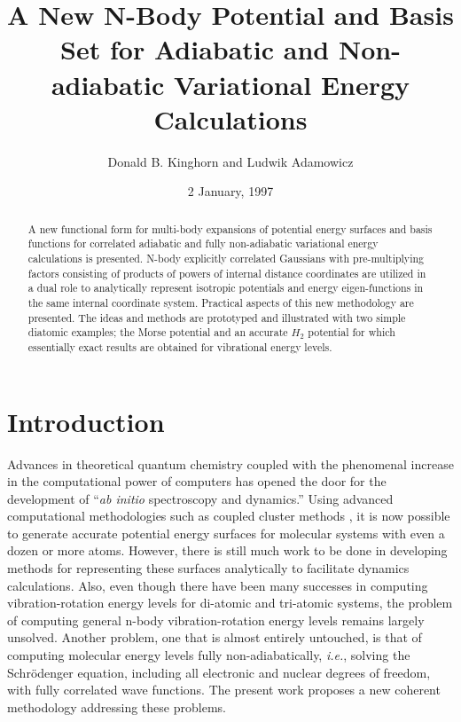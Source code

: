 






\author{Donald B. Kinghorn and Ludwik Adamowicz}
\address{Dept. of Chemistry, University of Arizona, Tucson, AZ 85721}
\title{A New N-Body Potential and Basis Set for Adiabatic and Non-adiabatic
Variational Energy Calculations }
\date{2 January, 1997}
\maketitle

\begin{abstract}
A new functional form for multi-body expansions of potential energy surfaces
and basis functions for correlated adiabatic and fully non-adiabatic
variational energy calculations is presented. N-body explicitly correlated
Gaussians with pre-multiplying factors consisting of products of powers of
internal distance coordinates are utilized in a dual role to analytically
represent isotropic potentials and energy eigen-functions in the same
internal coordinate system. Practical aspects of this new methodology are
presented. The ideas and methods are prototyped and illustrated with two
simple diatomic examples; the Morse potential and an accurate $H_2$
potential for which essentially exact results are obtained for vibrational
energy levels.
\end{abstract}

\section{Introduction}

Advances in theoretical quantum chemistry coupled with the phenomenal
increase in the computational power of computers has opened the door for the
development of ``{\em ab initio} spectroscopy and dynamics.'' Using advanced
computational methodologies such as coupled cluster methods\cite{Bartlett95}%
, it is now possible to generate accurate potential energy surfaces for
molecular systems with even a dozen or more atoms. However, there is still
much work to be done in developing methods for representing these surfaces
analytically to facilitate dynamics calculations. Also, even though there
have been many successes in computing vibration-rotation energy levels for
di-atomic and tri-atomic systems, the problem of computing general n-body
vibration-rotation energy levels remains largely unsolved. Another problem,
one that is almost entirely untouched, is that of computing molecular energy
levels fully non-adiabatically, {\it i.e.}, solving the Schr\"{o}denger
equation, including all electronic and nuclear degrees of freedom, with
fully correlated wave functions. The present work proposes a new coherent
methodology addressing these problems.


